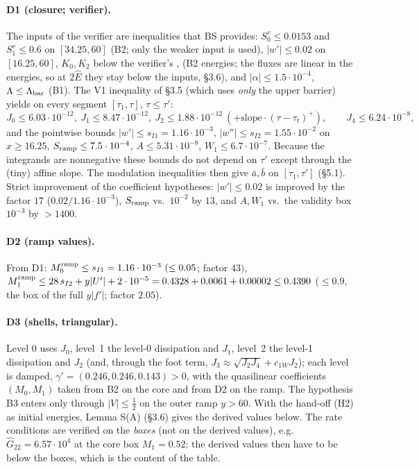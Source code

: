 \documentclass[11pt]{article}
\theoremstyle{definition}
\theoremstyle{remark}
\newcommand{\fn}[1]{\texttt{\detokenize{#1}}}
\begin{document}
\paragraph{D1 (closure; verifier).} The inputs of the verifier are inequalities that BS provides: $S_0^v\le0.0153$ and $S_1^v\le0.6$ on $[34.25,60]$ (B2; only the weaker input is used), $|w'|\le0.02$ on $[16.25,60]$, $K_0,K_2$ below the verifier's \fn{FLUX0}, \fn{FLUX2} (B2 energies; the fluxes are linear in the energies, so at $2\hat E$ they stay below the inputs, \S3.6), and $|\alpha|\le1.5\cdot10^{-4}$, $\Lambda\le\Lambda_{\rm bar}$ (B1). The V1 inequality of \S3.5 (which uses \emph{only} the upper barrier) yields on every segment $[\tau_1,\tau]$, $\tau\le\tau'$:
\[
J_0\le6.03\cdot10^{-12},\ J_1\le8.47\cdot10^{-12},\ J_2\le1.88\cdot10^{-12}\ (+\text{slope}\cdot(\tau-\tau_t)^+),\qquad J_4\le6.24\cdot10^{-8},
\]
and the pointwise bounds $|w'|\le s_{I1}=1.16\cdot10^{-3}$, $|w''|\le s_{I2}=1.55\cdot10^{-2}$ on $x\ge16.25$, $S_{\rm ramp}\le7.5\cdot10^{-4}$, $A\le5.31\cdot10^{-8}$, $W_1\le6.7\cdot10^{-7}$. Because the integrands are nonnegative these bounds do not depend on $\tau'$ except through the (tiny) affine slope. The modulation inequalities then give $\bar a,\bar b$ on $[\tau_1,\tau']$ (\S5.1). Strict improvement of the coefficient hypotheses: $|w'|\le0.02$ is improved by the factor $17$ ($0.02/1.16\cdot10^{-3}$), $S_{\rm ramp}$ vs.\ $10^{-2}$ by $13$, and $A,W_1$ vs.\ the validity box $10^{-3}$ by $>1400$.

\paragraph{D2 (ramp values).} From D1: $M_0^{\rm ramp}\le s_{I1}=1.16\cdot10^{-3}\ (\le0.05$; factor $43)$, $M_1^{\rm ramp}\le28\,s_{I2}+y|U'|+2\cdot10^{-5}=0.4328+0.0061+0.00002\le0.4390$ ($\le0.9$, the box of the full $y|f'|$; factor $2.05$).

\paragraph{D3 (shells, triangular).} Level $0$ uses $J_0$, level~1 the level-0 dissipation and $J_1$, level~2 the level-1 dissipation and $J_2$ (and, through the foot term, $J_3\approx\sqrt{J_2J_4}+c_{1W}J_2$); each level is damped, $\gamma'=(0.246,0.246,0.143)>0$, with the quasilinear coefficients $(M_0,M_1)$ taken from B2 on the core and from D2 on the ramp. The hypothesis B3 enters only through $|V|\le\tfrac12$ on the outer ramp $y>60$. With the hand-off (H2) as initial energies, Lemma S(A) (\S3.6) gives the derived values below. The rate conditions are verified on the \emph{boxes} (not on the derived values), e.g.\ $\hat G_{22}=6.57\cdot10^{4}$ at the core box $M_1=0.52$; the derived values then have to be below the boxes, which is the content of the table.
\end{document}
